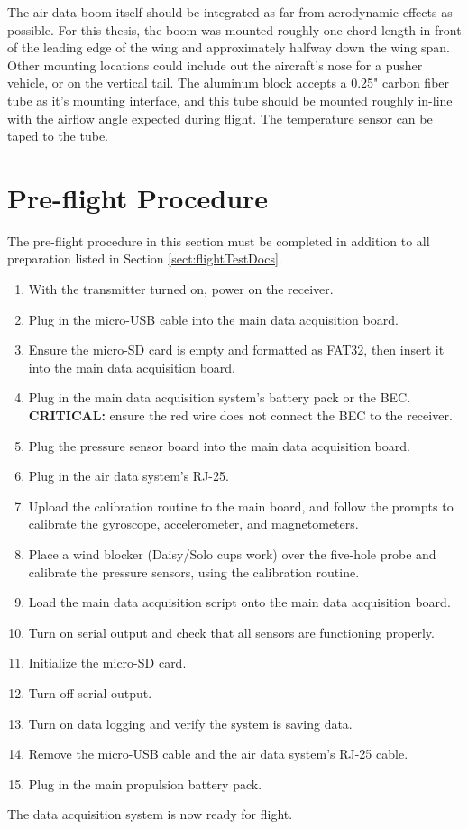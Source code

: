 The air data boom itself should be integrated as far from aerodynamic effects as possible. For this thesis, the boom was mounted roughly one chord length in front of the leading edge of the wing and approximately halfway down the wing span. Other mounting locations could include out the aircraft's nose for a pusher vehicle, or on the vertical tail. The aluminum block accepts a 0.25" carbon fiber tube as it's mounting interface, and this tube should be mounted roughly in-line with the airflow angle expected during flight. The temperature sensor can be taped to the tube.

\section{Pre-flight Procedure}
\label{sect:preFlightProc}
The pre-flight procedure in this section must be completed in addition to all preparation listed in Section \ref{sect:flightTestDocs}.

\begin{enumerate}
\item With the transmitter turned on, power on the receiver.
\item Plug in the micro-USB cable into the main data acquisition board.
\item Ensure the micro-SD card is empty and formatted as FAT32, then insert it into the main data acquisition board.
\item Plug in the main data acquisition system's battery pack or the BEC. \textbf{CRITICAL:} ensure the red wire does not connect the BEC to the receiver.
\item Plug the pressure sensor board into the main data acquisition board.
\item Plug in the air data system's RJ-25.
\item Upload the calibration routine to the main board, and follow the prompts to calibrate the gyroscope, accelerometer, and magnetometers.
\item Place a wind blocker (Daisy/Solo cups work) over the five-hole probe and calibrate the pressure sensors, using the calibration routine.
\item Load the main data acquisition script onto the main data acquisition board.
\item Turn on serial output and check that all sensors are functioning properly.
\item Initialize the micro-SD card.
\item Turn off serial output.
\item Turn on data logging and verify the system is saving data.
\item Remove the micro-USB cable and the air data system's RJ-25 cable.
\item Plug in the main propulsion battery pack.
\end{enumerate}
The data acquisition system is now ready for flight.

